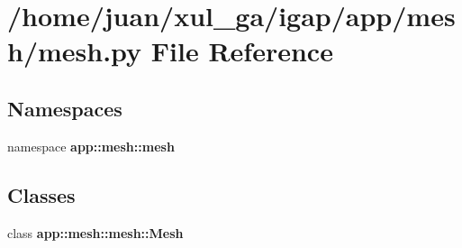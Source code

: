 \section{/home/juan/xul\_\-ga/igap/app/mesh/mesh.py File Reference}
\label{mesh_8py}
\subsection*{Namespaces}
\begin{CompactItemize}
\item 
namespace {\bf app::mesh::mesh}
\end{CompactItemize}
\subsection*{Classes}
\begin{CompactItemize}
\item 
class {\bf app::mesh::mesh::Mesh}
\end{CompactItemize}
